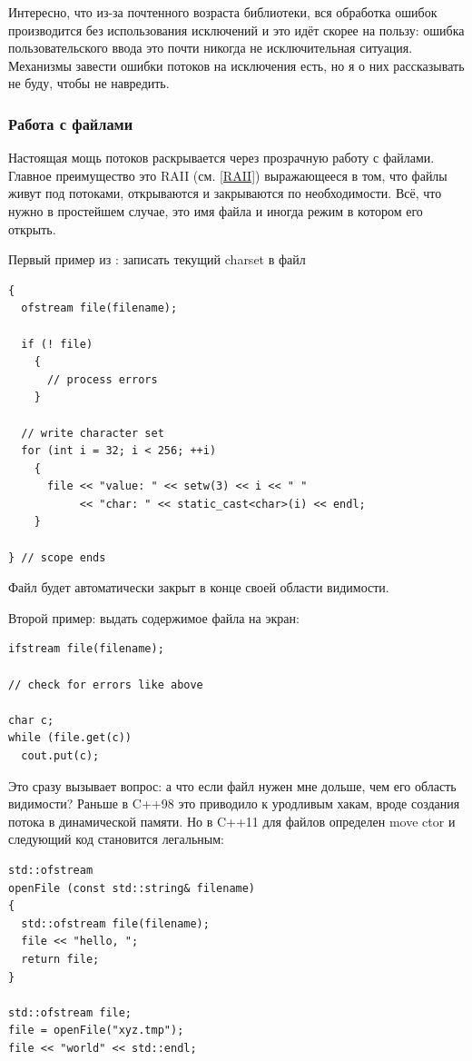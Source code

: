 \documentclass[a4paper,12pt,oneside]{article}
\begin{document}
Интересно, что из-за почтенного возраста библиотеки, вся обработка ошибок производится без использования исключений и это идёт скорее на пользу: ошибка пользовательского ввода это почти никогда не исключительная ситуация. Механизмы завести ошибки потоков на исключения есть, но я о них рассказывать не буду, чтобы не навредить.

\subsubsection{Работа с файлами}

Настоящая мощь потоков раскрывается через прозрачную работу с файлами. Главное преимущество это RAII (см. \ref{RAII}) выражающееся в том, что файлы живут под потоками, открываются и закрываются по необходимости. Всё, что нужно в простейшем случае, это имя файла и иногда режим в котором его открыть.

Первый пример из \cite{josuttis2}: записать текущий charset в файл

\begin{lstlisting}
{
  ofstream file(filename);

  if (! file) 
    {
      // process errors
    }

  // write character set
  for (int i = 32; i < 256; ++i) 
    {
      file << "value: " << setw(3) << i << " " 
           << "char: " << static_cast<char>(i) << endl;
    }

} // scope ends
\end{lstlisting}

Файл будет автоматически закрыт в конце своей области видимости.

Второй пример: выдать содержимое файла на экран:

\begin{lstlisting}
ifstream file(filename);

// check for errors like above

char c;
while (file.get(c)) 
  cout.put(c);
\end{lstlisting}

Это сразу вызывает вопрос: а что если файл нужен мне дольше, чем его область видимости? Раньше в C++98 это приводило к уродливым хакам, вроде создания потока в динамической памяти. Но в C++11 для файлов определен move ctor и следующий код становится легальным:

\begin{lstlisting}
std::ofstream 
openFile (const std::string& filename)
{
  std::ofstream file(filename);
  file << "hello, ";
  return file;
}

std::ofstream file;
file = openFile("xyz.tmp");
file << "world" << std::endl;
\end{lstlisting}
\end{document}
